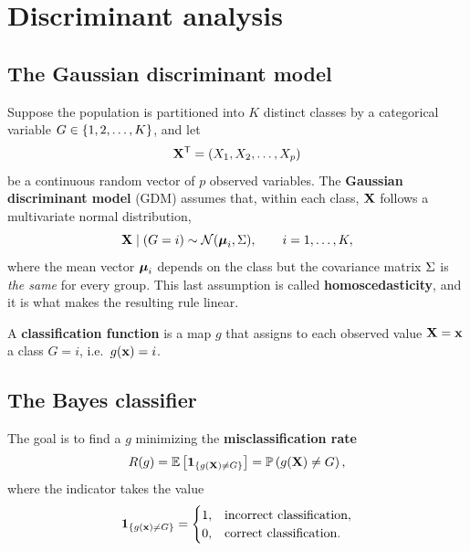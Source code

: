 \section{Discriminant analysis}
\label{sec:discriminant_analysis}

\subsection{The Gaussian discriminant model}
\label{subsec:gaussian_discriminant_model}

Suppose the population is partitioned into $K$ distinct classes by a categorical
variable $G\in\left\{ 1,2,\dots,K \right\}$, and let
\[
  \mathbf{X}^{\mathsf{T}}=(X_1,X_2,\dots,X_p)
\]
be a continuous random vector of $p$ observed variables. The
\textbf{Gaussian discriminant model} (GDM) assumes that, within each class,
$\mathbf{X}$ follows a multivariate normal distribution,
\begin{equation}
  \label{eq:gdm_conditional}
  \mathbf{X}\mid(G=i)\sim\mathcal{N}(\boldsymbol{\mu}_i,\Sigma),
  \qquad i=1,\dots,K,
\end{equation}
where the mean vector $\boldsymbol{\mu}_i$ depends on the class but the covariance matrix
$\Sigma$ is \emph{the same} for every group. This last assumption is called
\textbf{homoscedasticity}, and it is what makes the resulting rule linear.

\begin{definition}
  A \textbf{classification function} is a map $g$ that assigns to each observed
  value $\mathbf{X}=\mathbf{x}$ a class $G=i$, i.e.\ $g(\mathbf{x})=i$.
\end{definition}

\subsection{The Bayes classifier}
\label{subsec:bayes_classifier}

The goal is to find a $g$ minimizing the \textbf{misclassification rate}
\begin{equation}
  \label{eq:risk}
  R(g)=\mathbb{E}\left[ \mathbf{1}_{\left\{ g(\mathbf{X})\neq G \right\}} \right]
      =\mathbb{P}\left( g(\mathbf{X})\neq G \right),
\end{equation}
where the indicator takes the value
\begin{equation}
  \label{eq:indicator}
  \mathbf{1}_{\left\{ g(\mathbf{x})\neq G \right\}}=
  \begin{cases}
    1, & \text{incorrect classification},\\
    0, & \text{correct classification}.
  \end{cases}
\end{equation}

